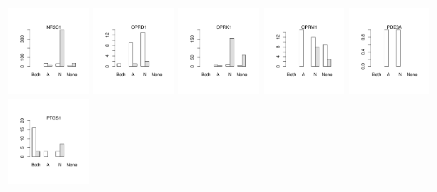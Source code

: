 \documentclass[utf8]{frontiersSCNS} %
\begin{document}
\begin{figure}[h!]
\vspace*{-15pt} %
\includegraphics[width=0.19\textwidth]{figures/validation_plots/nr3c1_0p9_valplot.pdf}
\includegraphics[width=0.19\textwidth]{figures/validation_plots/oprd1_0p9_valplot.pdf}
\includegraphics[width=0.19\textwidth]{figures/validation_plots/oprk1_0p9_valplot.pdf}
\includegraphics[width=0.19\textwidth]{figures/validation_plots/oprm1_0p9_valplot.pdf}
\includegraphics[width=0.19\textwidth]{figures/validation_plots/pde3a_0p9_valplot.pdf}
\vspace*{-15pt} %
\includegraphics[width=0.19\textwidth]{figures/validation_plots/ptgs1_0p9_valplot.pdf}

\end{figure}
\end{document}
